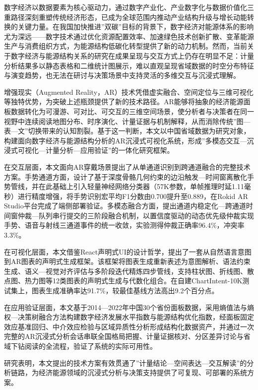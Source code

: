 
数字经济以数据要素为核心驱动力，通过数字产业化、产业数字化与数据价值化三重路径深刻重塑传统经济形态，已成为全球范围内推动产业结构升级与增长动能转换的关键力量。在我国加快推进”双碳”目标的背景下，数字经济对能源体系的影响尤为深远——数字技术通过优化资源配置效率、加速绿色技术创新扩散、变革能源生产与消费组织方式，为能源结构低碳化转型提供了新的动力机制。然而，当前关于数字经济与能源结构关系的研究在成果呈现与交互方式上仍存在明显不足：计量分析结果多以静态表格和二维统计图展示，难以直观呈现省域数据的时空分布特征与演变趋势，也无法在研讨与决策场景中支持灵活的多维交互与沉浸式理解。

增强现实（Augmented Reality，AR）技术凭借虚实融合、空间定位与三维可视化等独特优势，为突破上述瓶颈提供了新的技术路径。AR能够将抽象的经济能源面板数据转化为可漫游、可对比、可交互的三维空间场景，使分析者与决策者在同一视野中连续阅读地图分布、时序演化、计量证据与机制解释，从而消除传统”图—表—文”切换带来的认知割裂。基于这一判断，本文以中国省域数据为研究对象，构建面向数字经济与能源结构分析的AR沉浸式可视化系统，形成”多模态交互—沉浸式可视化—计量分析—应用验证”的一体化研究框架。

在交互层面，本文面向AR穿戴场景提出了从单通道识别到跨通道融合的完整技术方案。手势通道方面，设计了基于深度骨骼几何约束的边沿触发—时间窗离散化手势管线，并在此基础上引入轻量神经网络分类器（57K参数，单帧推理时延1.11毫秒）进行精度增强，将手势识别宏平均F1分数由0.700提升至0.889，在Rokid AR Studio平台完成了端侧部署验证。多模态融合方面，提出通道内稳定化—跨通道时间窗仲裁—队列串行提交的三阶段融合机制，以置信度驱动的动态优先级仲裁实现手势、语音与射线三通道事件的统一收敛，实验测得仲裁正确率96.4\%，冲突率3.3\%。

在可视化层面，本文借鉴React声明式UI的设计哲学，提出了一套从自然语言意图到AR图表的声明式生成框架。该框架将图表生成重新表述为意图解析、语法约束生成、语义—视觉对齐评估与多阶段迭代精炼四步管线，支持柱状图、折线图、散点图、热力图等12类图表的声明式生成与代数化组合。在自建ChartIntent-10K测试集上，图表生成准确率达91.7\%，较最佳基线方法高出9.2个百分点。

在应用验证层面，本文基于2014—2022年中国30个省份面板数据，采用熵值法与熵权—决策树融合方法构建数字经济发展水平指数与能源结构优化指数，经面板固定效应基准回归、中介效应检验与区域异质性分析形成结构化数据资产，并通过一次完整的AR沉浸式分析会话串联全国格局把握、计量证据核对、分区差异讨论与省域下钻阅读的全流程，验证了系统的实际可用性。

研究表明，本文提出的技术方案有效贯通了”计量结论—空间表达—交互解读”的分析链路，为经济能源领域的沉浸式分析与决策支持提供了可复现、可部署的系统方案。

